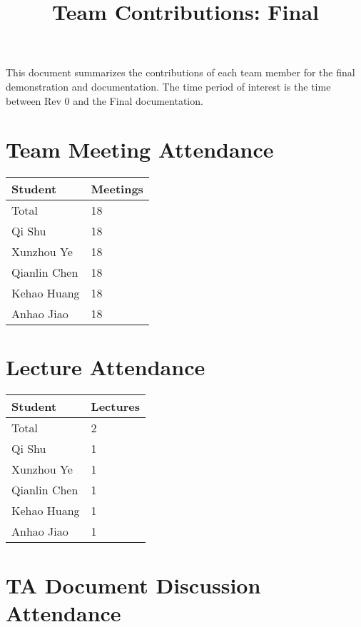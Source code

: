 \documentclass{article}
\title{Team Contributions: Final\\\progname}
\author{\authname}
\date{}
\begin{document}
\maketitle

This document summarizes the contributions of each team member for the final
demonstration and documentation.  The time period of interest is the time
between Rev 0 and the Final documentation.

\section{Team Meeting Attendance}

\begin{table}[H]
\centering
\begin{tabular}{ll}
\toprule
\textbf{Student} & \textbf{Meetings}\\
\midrule
Total        & 18          \\
Qi Shu       & 18          \\
Xunzhou Ye   & 18          \\
Qianlin Chen & 18          \\
Kehao Huang  & 18          \\
Anhao Jiao   & 18          \\
\bottomrule
\end{tabular}
\end{table}

\section{Lecture Attendance}

\begin{table}[H]
\centering
\begin{tabular}{ll}
\toprule
\textbf{Student} & \textbf{Lectures}\\
\midrule
Total        & 2          \\
Qi Shu       & 1          \\
Xunzhou Ye   & 1          \\
Qianlin Chen & 1          \\
Kehao Huang  & 1          \\
Anhao Jiao   & 1          \\
\bottomrule
\end{tabular}
\end{table}

\section{TA Document Discussion Attendance}
\end{document}
